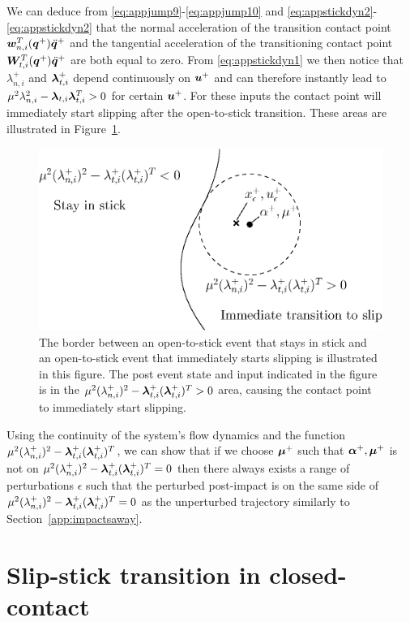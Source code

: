 \documentclass[../DC2017114Bouma.tex]{subfiles}
\begin{document}
We can deduce from \eqref{eq:appjump9}-\eqref{eq:appjump10} and \eqref{eq:appstickdyn2}-\eqref{eq:appstickdyn2} that the normal acceleration of the transition contact point ${\boldsymbol{w}}^T_{n,i}({\boldsymbol{q}}^+)\ddot{{\boldsymbol{q}}}^+$ and the tangential acceleration of the transitioning contact point ${\boldsymbol{W}}^T_{t,i}({\boldsymbol{q}}^+)\ddot{{\boldsymbol{q}}}^+$ are both equal to zero. From \eqref{eq:appstickdyn1} we then notice that $\lambda_{n,i}^+$ and $\boldsymbol{\lambda}_{t,i}^+$ depend continuously on ${\boldsymbol{u}}^+$ and can therefore instantly lead to $\mu^2\lambda_{n,i}^2 - \boldsymbol{\lambda}_{t,i}\boldsymbol{\lambda}_{t,i}^T>0$ for certain ${\boldsymbol{u}}^+$. For these inputs the contact point will immediately start slipping after the open-to-stick transition. These areas are illustrated in Figure~\ref{fig:stickimmedslip}.

\begin{figure}[h]
\centering
\includegraphics[width=.55\textwidth]{stickimmedslip.eps}\caption{The border between an open-to-stick event that stays in stick and an open-to-stick event that immediately starts slipping is illustrated in this figure. The post event state and input indicated in the figure is in the $\mu^2(\lambda^+_{n,i})^2 - \boldsymbol{\lambda}^+_{t,i}(\boldsymbol{\lambda}^+_{t,i})^T > 0$ area, causing the contact point to immediately start slipping.} \label{fig:stickimmedslip}
\end{figure}

Using the continuity of the system's flow dynamics and the function $\mu^2(\lambda^+_{n,i})^2 - \boldsymbol{\lambda}^+_{t,i}(\boldsymbol{\lambda}^+_{t,i})^T$, we can show that if we choose $\boldsymbol{\mu}^+$ such that $\boldsymbol{\alpha}^+,\boldsymbol{\mu}^+$ is not on $\mu^2(\lambda^+_{n,i})^2 - \boldsymbol{\lambda}^+_{t,i}(\boldsymbol{\lambda}^+_{t,i})^T = 0$ then there always exists a range of perturbations $\epsilon$ such that the perturbed post-impact is on the same side of $\mu^2(\lambda^+_{n,i})^2 - \boldsymbol{\lambda}^+_{t,i}(\boldsymbol{\lambda}^+_{t,i})^T = 0$ as the unperturbed trajectory similarly to Section~\ref{app:impactsaway}.

\section{Slip-stick transition in closed-contact}
\end{document}
